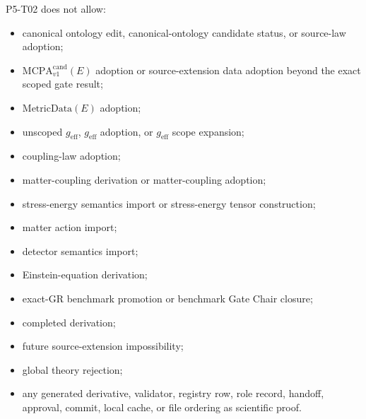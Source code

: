 \documentclass[11pt]{article}
\newcommand{\MetricData}{\mathrm{MetricData}}
\newcommand{\geff}{g_{\mathrm{eff}}}
\newcommand{\MCPA}{\mathrm{MCPA}^{\mathrm{cand}}_{v1}}
\begin{document}
P5-T02 does not allow:
\begin{itemize}[leftmargin=*]
\item canonical ontology edit, canonical-ontology candidate status, or
  source-law adoption;
\item \(\MCPA(E)\) adoption or source-extension data adoption beyond the exact
  scoped gate result;
\item \(\MetricData(E)\) adoption;
\item unscoped \(\geff\), \(\geff\) adoption, or \(\geff\) scope expansion;
\item coupling-law adoption;
\item matter-coupling derivation or matter-coupling adoption;
\item stress-energy semantics import or stress-energy tensor construction;
\item matter action import;
\item detector semantics import;
\item Einstein-equation derivation;
\item exact-GR benchmark promotion or benchmark Gate Chair closure;
\item completed derivation;
\item future source-extension impossibility;
\item global theory rejection;
\item any generated derivative, validator, registry row, role record, handoff,
  approval, commit, local cache, or file ordering as scientific proof.
\end{itemize}
\end{document}
